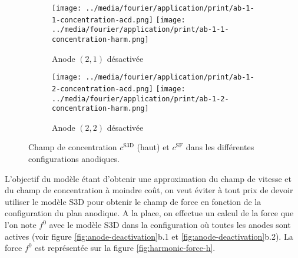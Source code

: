 \begin{figure}[h!]
  \begin{center}
    \begin{subfigure}[t]{\textwidth}
      \begin{center}
        \texttt{[image: ../media/fourier/application/print/ab-1-1-concentration-acd.png]}
        \texttt{[image: ../media/fourier/application/print/ab-1-1-concentration-harm.png]}
        \caption{Anode $(2,1)$ désactivée}
        \label{fig:}
      \end{center}
    \end{subfigure}

    \begin{subfigure}[t]{\textwidth}
      \begin{center}
        \texttt{[image: ../media/fourier/application/print/ab-1-2-concentration-acd.png]}
        \texttt{[image: ../media/fourier/application/print/ab-1-2-concentration-harm.png]}
        \caption{Anode $(2,2)$ désactivée}
        \label{fig:}
      \end{center}
    \end{subfigure}


    \caption{Champ de concentration $c^\mathrm{S3D}$ (haut) et
      $c^\mathrm{SF}$ dans les différentes configurations anodiques.}

    \label{fig:harmonic-concentration-comp-b}
  \end{center}
\end{figure}

L'objectif du modèle étant d'obtenir une approximation du champ de
vitesse et du champ de concentration à moindre coût, on veut éviter à
tout prix de devoir utiliser le modèle S3D pour obtenir le champ de
force en fonction de la configuration du plan anodique. A la place, on
effectue un calcul de la force que l'on note $f^0$ avec le modèle S3D
dans la configuration où toutes les anodes sont actives (voir figure
\ref{fig:anode-deactivation}b.1 et
\ref{fig:anode-deactivation}b.2). La force $f^0$ est représentée sur
la figure \ref{fig:harmonic-force-h}.

